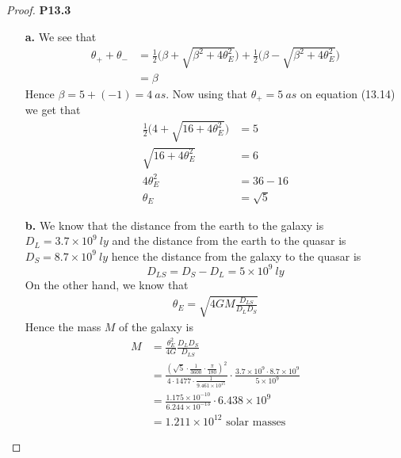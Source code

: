 \documentclass[11pt]{article}
\theoremstyle{definition}
\begin{document}
\cleardoublepage
\begin{proof}{\textbf{P13.3}}
\begin{itemize}
\item [\textbf{a.}] We see that 
\begin{align*}
    \theta_+ + \theta_-
    &= \frac{1}{2}\bigg(\beta + \sqrt{\beta^2 + 4\theta_E^2}\bigg)
    + \frac{1}{2}\bigg(\beta - \sqrt{\beta^2 + 4\theta_E^2}\bigg)\\
    &= \beta
\end{align*}
Hence $\beta = 5 + (-1) = 4~as$. Now using that $\theta_+ = 5~as$ on equation
(13.14) we get that
\begin{align*}
    \frac{1}{2}\bigg(4 + \sqrt{16 + 4\theta_E^2}\bigg) &= 5\\
    \sqrt{16 + 4\theta_E^2} &= 6\\
    4\theta_E^2 &= 36 - 16\\
    \theta_E &= \sqrt{5}
\end{align*}
\item [\textbf{b.}] We know that the distance from the earth to the galaxy is
$D_{L} = 3.7 \times 10^9~ly$ and the distance from the earth to the quasar is
$D_{S} = 8.7 \times 10^9~ly$ hence the distance from the galaxy to the quasar is
$$D_{LS} = D_S - D_L = 5 \times 10^9~ly$$
On the other hand, we know that 
\begin{align*}
    \theta_E = \sqrt{4GM\frac{D_{LS}}{D_LD_S}}
\end{align*}
Hence the mass $M$ of the galaxy is 
\begin{align*}
    M &= \frac{\theta_E^2}{4G}\frac{D_LD_S}{D_{LS}}\\
    &= \frac{(\sqrt{5} \cdot \frac{1}{3600} \cdot \frac{\pi}{180})^2}
    {4 \cdot 1477 \cdot \frac{1}{9.461 \times 10^{15}}}
    \cdot \frac{3.7 \times 10^9 \cdot 8.7 \times 10^9}{5\times 10^9}\\[7pt]
    &= \frac{1.175\times 10^{-10}}{6.244 \times 10^{-13}}
    \cdot 6.438 \times 10^9\\[7pt]
    &= 1.211 \times 10^{12} \text{ solar masses}
\end{align*}
\end{itemize}
\end{proof}
\end{document}
